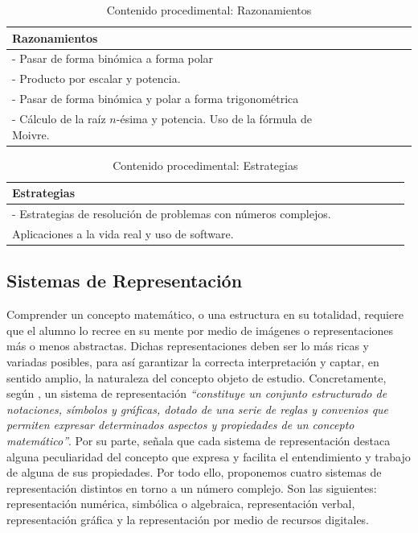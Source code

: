 \documentclass[../main.tex]{memoir}
\begin{document}
\begin{table}[H]
	\centering
	\begin{tabular}{lcccccc}
		\toprule
		\hspace{5cm}Razonamientos \\
		\midrule
		- Pasar de forma binómica a forma polar \\
		- Producto por escalar y potencia. \\
		- Pasar de forma binómica y polar a forma trigonométrica\\
		- Cálculo de la raíz $n$-ésima y potencia. Uso de la fórmula de Moivre.\\
		\bottomrule
	\end{tabular}
	\caption{Contenido procedimental: Razonamientos}
	\label{tab:razonamientos}
\end{table}


\begin{table}[H]
	\centering
	\begin{tabular}{lcccccc}
		\toprule
		\hspace{5cm}Estrategias \\
		\midrule
		- Estrategias de resolución de problemas con números complejos. \\ \hspace{0.2cm}Aplicaciones a la vida real y uso de software. \\
		\bottomrule
	\end{tabular}
	\caption{Contenido procedimental: Estrategias}
	\label{tab:estrategias}
\end{table}



\subsection{Sistemas de Representación}

Comprender un concepto matemático, o una estructura en su totalidad, requiere que el alumno lo recree en su mente por medio de imágenes o representaciones más o menos abstractas. Dichas representaciones deben ser lo más ricas y variadas posibles, para así garantizar la correcta interpretación y captar, en sentido amplio, la naturaleza del concepto objeto de estudio. Concretamente, según \cite{rico2016}, un sistema de representación \textit{``constituye un conjunto estructurado de notaciones, símbolos y gráficas, dotado de una serie de reglas y convenios que permiten expresar determinados aspectos y propiedades de un concepto matemático''}. Por su parte, \cite{lupi2013} señala que cada sistema de representación destaca alguna peculiaridad del concepto que expresa y facilita el entendimiento y trabajo de alguna de sus propiedades. Por todo ello, proponemos cuatro sistemas de representación distintos en torno a un número complejo. Son las siguientes: representación numérica, simbólica o algebraica, representación verbal, representación gráfica y la representación por medio de recursos digitales. 
\end{document}

